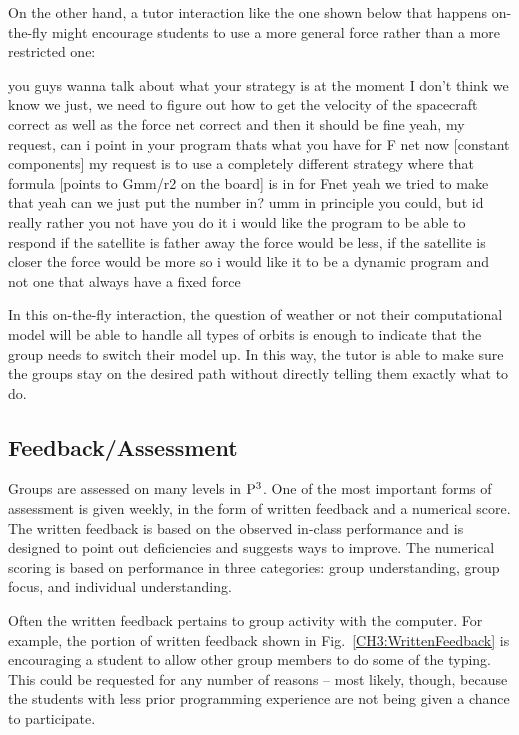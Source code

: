 \documentclass{msuphddissertation}
\begin{document}
\begin{doublespace}
On the other hand, a tutor interaction like the one shown below that happens on-the-fly might encourage students to use a more general force rather than a more restricted one:  \begin{description}\TA  you guys wanna talk about what your strategy is at the moment
\SB  I don't think we know	
\SA we just, we need to figure out how to get the velocity of the spacecraft correct as well as the force net correct and then it should be fine				
\TA yeah, my request, can i point in your program thats what you have for F net now [constant components] my request is to use a completely different strategy where that formula [points to Gmm/r2 on the board] is in for Fnet
\SC yeah we tried to make that yeah		
\SA can we just put the number in?				
\TA umm in principle you could, but id really rather you not have you do it i would like the program to be able to respond if the satellite is father away the force would be less, if the satellite is closer the force would be more so i would like it to be a dynamic program and not one that always have a fixed force\end{description}  In this on-the-fly interaction, the question of weather or not their computational model will be able to handle all types of orbits is enough to indicate that the group needs to switch their model up.  In this way, the tutor is able to make sure the groups stay on the desired path without directly telling them exactly what to do.

\subsection{Feedback/Assessment}

Groups are assessed on many levels in ${\rm P}^{3}$.  One of the most important forms of assessment is given weekly, in the form of written feedback and a numerical score.  The written feedback is based on the observed in-class performance and is designed to point out deficiencies and suggests ways to improve.  The numerical scoring is based on performance in three categories: group understanding, group focus, and individual understanding.

Often the written feedback pertains to group activity with the computer.  For example, the portion of written feedback shown in Fig.~\ref{CH3:WrittenFeedback} is encouraging a student to allow other group members to do some of the typing.   This could be requested for any number of reasons -- most likely, though, because the students with less prior programming experience are not being given a chance to participate.


\end{doublespace}
\end{document}
